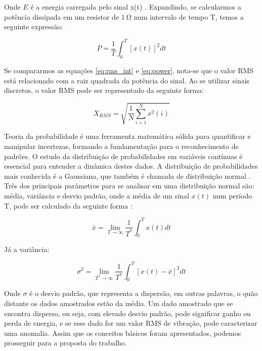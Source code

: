 \documentclass[a4paper]{ifacconf}
\begin{document}
Onde $E$ é a energia carregada pelo sinal x(t) \citep{Oppenheim2016}. Expandindo, se calcularmos a potência dissipada em um resistor de
$\SI{1}{\ohm}$ num intervalo de tempo T, temos a seguinte expressão:

\begin{equation}\label{eq:power}
    P = \frac{1}{T}\int_{0}^{T}{[x(t)]^2dt}
\end{equation}

Se compararmos as equações \ref{eq:rms_int} e \ref{eq:power}, nota-se que o valor RMS está relacionado com a raiz quadrada da potência do 
sinal. Ao se utilizar sinais discretos, o valor RMS pode ser representado da seguinte forma:

\begin{equation}\label{eq:rms_disc}
    X_{RMS} = \sqrt{\frac{1}{N}\sum_{i=1}^{N}{x^2(i)}}
\end{equation}

Teoria da probabilidade é uma ferramenta matemática sólida
para quantificar e manipular incertezas, formando a fundamentação para o reconhecimento de padrões. O estudo da 
distribuição de probabilidades em variáveis contínuas é essencial para entender a dinâmica destes dados. A distribuição de probabilidades mais
conhecida é a Gaussiana, que também é chamada de distribuição normal \citep{Andersen1986}. Três dos principais parâmetros para se analisar
em uma distribuição normal são: média, variância e desvio padrão, onde a média de um sinal $x(t)$ num período T, pode ser calculado da seguinte
forma \citep{Dinardo}:

\begin{equation}\label{eq:X_lim}
    \bar{x} = \lim_{T\rightarrow\infty}{\frac{1}{T^*}} \int_{0}^{T}{x(t)dt}
\end{equation}

Já a variância:

\begin{equation}\label{eq:variancia}
    \sigma^2 = \lim_{T^{*}\rightarrow\infty}{\frac{1}{T^*}} \int_{0}^{T}{[x(t)-\bar{x}]^2dt}
\end{equation}

Onde $\sigma$ é o desvio padrão, que representa a dispersão, em outras palavras, o quão distante os dados amostrados estão da média. Um dado
amostrado que se encontra disperso, ou seja, com elevado desvio padrão, pode significar ganho ou perda de energia, e se esse dado
for um valor RMS de vibração, pode caracterizar uma anomalia. Assim que os conceitos básicos foram apresentados, podemos prosseguir para a proposta do trabalho.
\end{document}
